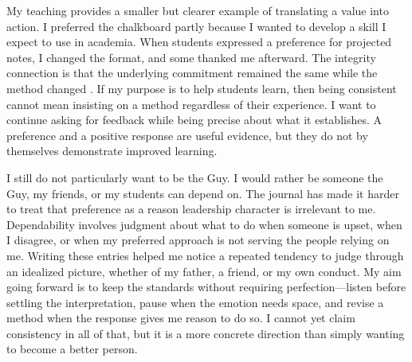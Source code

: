 \documentclass[12pt,stu,biblatex]{apa7}
\begin{document}
My teaching provides a smaller but clearer example of translating a value into action.
I preferred the chalkboard partly because I wanted to develop a skill I expect to use in academia.
When students expressed a preference for projected notes, I changed the format, and some thanked me afterward.
The integrity connection is that the underlying commitment remained the same while the method changed \parencite{caseSmith2013integrity}.
If my purpose is to help students learn, then being consistent cannot mean insisting on a method regardless of their experience.
I want to continue asking for feedback while being precise about what it establishes.
A preference and a positive response are useful evidence, but they do not by themselves demonstrate improved learning.

I still do not particularly want to be the Guy.
I would rather be someone the Guy, my friends, or my students can depend on.
The journal has made it harder to treat that preference as a reason leadership character is irrelevant to me.
Dependability involves judgment about what to do when someone is upset, when I disagree, or when my preferred approach is not serving the people relying on me.
Writing these entries helped me notice a repeated tendency to judge through an idealized picture, whether of my father, a friend, or my own conduct.
My aim going forward is to keep the standards without requiring perfection---listen before settling the interpretation, pause when the emotion needs space, and revise a method when the response gives me reason to do so.
I cannot yet claim consistency in all of that, but it is a more concrete direction than simply wanting to become a better person.

\printbibliography[heading=bibintoc]
\end{document}
